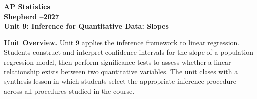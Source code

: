 \documentclass[10pt]{article}
\begin{document}
\vspace{-1.3in}

\begin{center}
  {\color{white}\bfseries\fontsize{24}{30}\selectfont AP Statistics}\\[5pt]
  {\color{goldacc}\bfseries\large Shepherd --2027}\\[10pt]
  {\color{white}\bfseries\Large Unit 9: Inference for Quantitative Data: Slopes}\\[3pt]
\end{center}

\vspace{0.18in}

\begin{tcolorbox}[colback=sky,colframe=navy,boxrule=0.9pt,arc=2mm,
    left=4mm,right=4mm,top=2mm,bottom=2mm]
  \small\textbf{Unit Overview.}\quad
  Unit 9 applies the inference framework to linear regression.
  Students construct and interpret confidence intervals for the slope of a
  population regression model, then perform significance tests to assess whether a
  linear relationship exists between two quantitative variables.
  The unit closes with a synthesis lesson in which students select the appropriate
  inference procedure across all procedures studied in the course.
\end{tcolorbox}

\vspace{0.14in}
\end{document}
